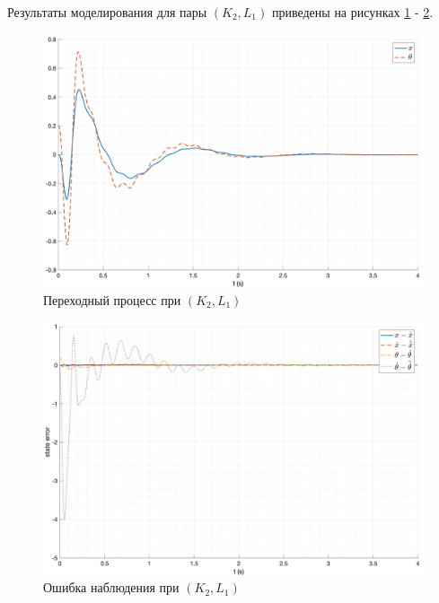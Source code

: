 Результаты моделирования для пары $(K_2, L_1)$ приведены на рисунках \ref{fig:KL_2_out} - \ref{fig:KL_2_err}.
\begin{figure}[ht!]
    \centering
    \includegraphics[width=\textwidth]{media/plots/nonmodal_observer_controller/kl_2.png}
    \caption{Переходный процесс при $(K_2, L_1)$}
    \label{fig:KL_2_out}
\end{figure}
\begin{figure}[ht!]
    \centering
    \includegraphics[width=\textwidth]{media/plots/nonmodal_observer_controller/kl_err_2.png}
    \caption{Ошибка наблюдения при $(K_2, L_1)$}
    \label{fig:KL_2_err}
\end{figure}
\FloatBarrier

